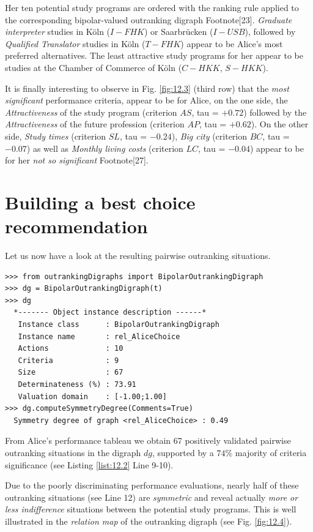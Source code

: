 Her ten potential study programs are ordered with the \NetFlows ranking rule applied to the corresponding bipolar-valued outranking digraph Footnote[23]. \emph{Graduate interpreter} studies in Köln ($I-FHK$) or Saarbrücken ($I-USB$), followed by \emph{Qualified Translator} studies in Köln ($T-FHK$) appear to be Alice's most preferred alternatives. The least attractive study programs for her appear to be studies at the Chamber of Commerce of Köln ($C-HKK$, $S-HKK$).

It is finally interesting to observe in Fig. \ref{fig:12.3} (third row) that the \emph{most significant} performance criteria, appear to be for Alice, on the one side, the \emph{Attractiveness} of the study program (criterion $AS$, tau = $+0.72$) followed by the \emph{Attractiveness} of the future profession (criterion $AP$, tau = $+0.62$). On the other side, \emph{Study times} (criterion $SL$, tau = $-0.24$), \emph{Big city} (criterion $BC$, tau = $-0.07$) as well as \emph{Monthly living costs} (criterion $LC$, tau = $-0.04$) appear to be for her  \emph{not so significant} Footnote[27].


\section{Building a best choice recommendation}
\label{sec:12.3}

Let us now have a look at the resulting pairwise outranking situations.

\begin{lstlisting}[caption={Computing Alice's outranking digraph},label=list:12.2]
>>> from outrankingDigraphs import BipolarOutrankingDigraph
>>> dg = BipolarOutrankingDigraph(t) 
>>> dg
  *------- Object instance description ------*
   Instance class      : BipolarOutrankingDigraph
   Instance name       : rel_AliceChoice
   Actions             : 10
   Criteria            : 9
   Size                : 67
   Determinateness (%) : 73.91
   Valuation domain    : [-1.00;1.00]
>>> dg.computeSymmetryDegree(Comments=True)
  Symmetry degree of graph <rel_AliceChoice> : 0.49
\end{lstlisting}

From Alice's performance tableau we obtain 67 positively validated pairwise outranking situations in the digraph $dg$, supported by a $74\%$ majority of criteria significance (see Listing \ref{list:12.2} Line 9-10).

Due to the poorly discriminating performance evaluations, nearly half of these outranking situations (see Line 12) are \emph{symmetric} and reveal actually \emph{more or less indifference} situations between the potential study programs. This is well illustrated in the \emph{relation map} of the outranking digraph (see Fig. \ref{fig:12.4}).

